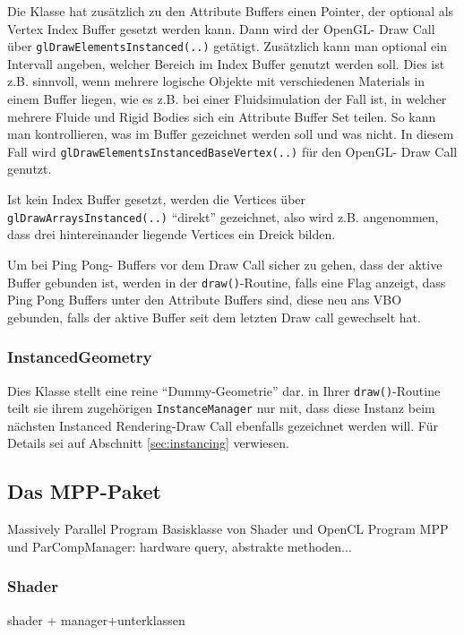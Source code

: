 	Die Klasse hat zusätzlich zu den Attribute Buffers einen Pointer, der optional als Vertex Index Buffer
	gesetzt werden kann. Dann wird der OpenGL- Draw Call über \lstinline|glDrawElementsInstanced(..)|
	getätigt.
	Zusätzlich kann man optional ein Intervall angeben, welcher Bereich 
	im Index Buffer genutzt werden soll.
	Dies ist z.B. sinnvoll, wenn mehrere logische Objekte mit verschiedenen Materials in einem Buffer
	liegen, wie es z.B. bei einer Fluidsimulation der Fall ist, in welcher mehrere Fluide und Rigid Bodies sich
	ein Attribute Buffer Set teilen. So kann man kontrollieren, was im Buffer gezeichnet werden soll und was nicht.
	In diesem Fall wird \lstinline|glDrawElementsInstancedBaseVertex(..)| für den OpenGL- Draw Call genutzt.
	
	Ist kein Index Buffer gesetzt, werden die Vertices über \lstinline|glDrawArraysInstanced(..)|	
	 "`direkt"' gezeichnet, also wird z.B. angenommen, dass drei hintereinander liegende Vertices ein Dreick bilden. 
	
	Um bei Ping Pong- Buffers vor dem Draw Call sicher zu gehen, dass der aktive Buffer gebunden ist,
	werden in der \lstinline|draw()|-Routine, falls eine Flag anzeigt, dass Ping Pong Buffers unter den 
	Attribute Buffers sind, diese neu ans VBO gebunden, falls der aktive Buffer seit dem letzten Draw call gewechselt hat.
	
	
	\subsubsection{InstancedGeometry}
	Dies Klasse stellt eine reine "`Dummy-Geometrie"' dar. in Ihrer \lstinline|draw()|-Routine teilt sie ihrem
	zugehörigen \lstinline|InstanceManager| nur mit, dass diese Instanz beim nächsten Instanced Rendering-Draw Call
	ebenfalls gezeichnet werden will. Für Details sei auf Abschnitt \ref{sec:instancing} verwiesen.
	
	

\subsection{Das MPP-Paket}



Massively Parallel Program
	Basisklasse von Shader und OpenCL Program
	MPP und ParCompManager: hardware query, abstrakte methoden...
	\subsubsection{Shader}
		shader + manager+unterklassen
		
